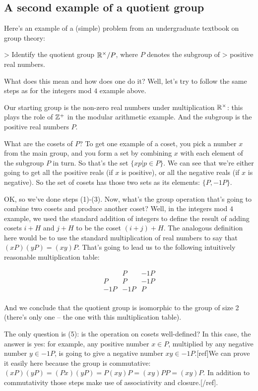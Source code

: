 \subsection{A second example of a quotient group}

Here's an example of a (simple) problem from an undergraduate textbook on group theory:

> Identify the quotient group $\mathbb{R}^\times/P$, where $P$ denotes the subgroup of
> positive real numbers.

What does this mean and how does one do it? Well, let's try to follow the same
steps as for the integers mod $4$ example above.

Our starting group is the non-zero real numbers under multiplication $\mathbb{R}^\times$:
this plays the role of $\mathbb{Z}^+$ in the modular arithmetic example. And the
subgroup is the positive real numbers $P$.

What are the cosets of $P$? To get one example of a coset, you pick a number
$x$ from the main group, and you form a set by combining $x$ with each element
of the subgroup $P$ in turn. So that's the set $\{xp|p \in P\}$. We can see
that we're either going to get all the positive reals (if $x$ is positive), or
all the negative reals (if $x$ is negative). So the set of cosets has those two
sets as its elements: $\{P, -1P\}$.

OK, so we've done steps (1)-(3). Now, what's the group operation that's going
to combine two cosets and produce another coset? Well, in the integers mod $4$
example, we used the standard addition of integers to define the result of
adding cosets $i+H$ and $j+H$ to be the coset $(i+j)+H$. The analogous
definition here would be to use the standard multiplication of real numbers to
say that $(xP)(yP) = (xy)P$. That's going to lead us to the following
intuitively reasonable multiplication table:

$$
\begin{array}{ c|cc }
 ~   & P   & -1P \\
 \hline
 P   & P   & -1P \\
 -1P & -1P & P \\
\end{array}
$$

And we conclude that the quotient group is isomorphic to the group of size 2
(there's only one -- the one with this multiplication table).

The only question is (5): is the operation on cosets well-defined? In this
case, the answer is yes: for example, any positive number $x \in P$, multiplied
by any negative number $y \in -1P$, is going to give a negative number $xy \in
-1P$.[ref]We can prove it easily here because the group is commutative:
$(xP)(yP) = (Px)(yP) = P(xy)P = (xy)PP = (xy)P$. In addition to commutativity
those steps make use of associativity and closure.[/ref].


